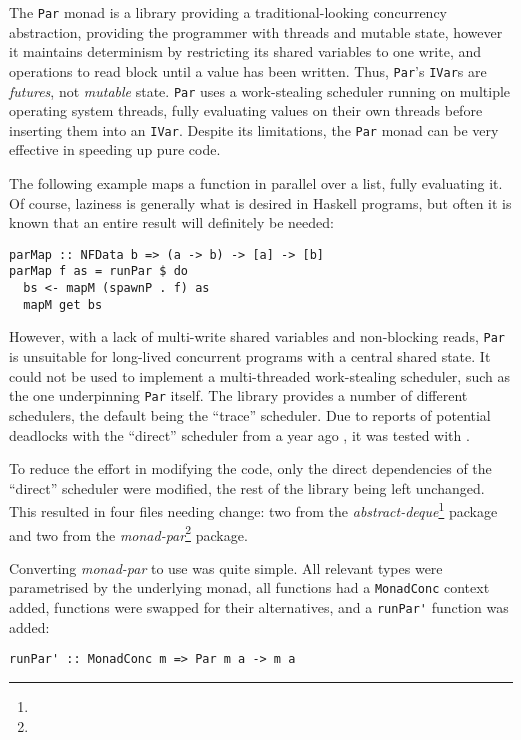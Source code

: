 The \verb|Par| monad \citep{parmonad} is a library providing a
traditional-looking concurrency abstraction, providing the programmer
with threads and mutable state, however it maintains determinism by
restricting its shared variables to one write, and operations to read
block until a value has been written. Thus, \verb|Par|'s \verb|IVar|s
are \emph{futures}, not \emph{mutable} state. \verb|Par| uses a
work-stealing scheduler running on multiple operating system threads,
fully evaluating values on their own threads before inserting them
into an \verb|IVar|. Despite its limitations, the \verb|Par| monad can
be very effective in speeding up pure code.

The following example maps a function in parallel over a list, fully
evaluating it. Of course, laziness is generally what is desired in
Haskell programs, but often it is known that an entire result will
definitely be needed:

\begin{verbatim}
parMap :: NFData b => (a -> b) -> [a] -> [b]
parMap f as = runPar $ do
  bs <- mapM (spawnP . f) as
  mapM get bs
\end{verbatim}

However, with a lack of multi-write shared variables and non-blocking
reads, \verb|Par| is unsuitable for long-lived concurrent programs
with a central shared state. It could not be used to implement a
multi-threaded work-stealing scheduler, such as the one underpinning
\verb|Par| itself. The library provides a number of different
schedulers, the default being the ``trace'' scheduler. Due to reports
of potential deadlocks with the ``direct'' scheduler from a year ago
\citep{parreddit}, it was tested with \dejafu{}.

To reduce the effort in modifying the code, only the direct
dependencies of the ``direct'' scheduler were modified, the rest of
the library being left unchanged. This resulted in four files needing
change: two from the
\emph{abstract-deque}\footnote{} package and
two from the \emph{monad-par}\footnote{} package.

Converting \emph{monad-par} to use \dejafu{} was quite simple. All
relevant types were parametrised by the underlying monad, all
functions had a \verb|MonadConc| context added, functions were swapped
for their \dejafu{} alternatives, and a \verb|runPar'| function was
added:

\begin{verbatim}
runPar' :: MonadConc m => Par m a -> m a
\end{verbatim}

